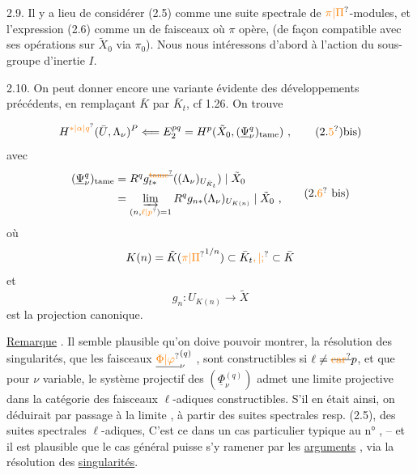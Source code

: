 2.9. Il y a lieu de considérer (2.5) comme une suite spectrale de $\unsure{\pi|\Pi}$-modules, et l'expression (2.6) comme un  de faisceaux  où $\pi$ opère, (de façon compatible avec ses opérations sur $\tilde X_0$ via $\pi_0$). Nous nous intéressons d'abord à l'action du sous-groupe  d'inertie $I$.

2.10. On peut donner encore une variante évidente des développements précédents, en remplaçant $\bar K$ par $\bar K_t$, cf 1.26. On trouve

\[
H^{\unsure{*|\alpha|q}}(\bar U,\Lambda_\nu)^P\Longleftarrow E_2^{pq}=H^p(\tilde X_0,(\underline\Psi_\nu^q)_{\mathrm{tame}})\ ,
\tag*{(2.\unsure{5})bis)}
\]
avec
\[
\begin{aligned}
(\underline\Psi_\nu^q)_{\mathrm{tame}}&=R^qg_{t*}^{\deleted{\unsure{\mathrm{tame}}}}((\Lambda_\nu)_{U_{\bar K_t}})\mid\tilde X_0\\
&=\varinjlim_{(n,\unsure{\ell|p})=1}R^qg_{n*}(\Lambda_\nu)_{U_{K(n)}}\mid\tilde X_0\ ,
\end{aligned}
\tag*{(2.\unsure{6} bis)}
\]
où
\[
K(n)=\tilde K({\unsure{\pi|\Pi}}^{1/n})\subset\bar K_t\unsure{,|;}\subset\bar K
\]
et
\[
g_n:U_{K(n)}\longrightarrow\tilde X
\]
est la projection canonique.

\uline{Remarque} . Il semble plausible qu'on doive pouvoir montrer,   la résolution des singularités, que les faisceaux $\underline{\unsure{\Phi|\varphi}}_\nu^{(q)}$ ,  sont constructibles si $\ell\ne\deleted{\unsure{\mathrm{car}}}p$, et que pour $\nu$ variable, le système projectif des $(\underline\Phi_\nu^{(q)})$   admet une limite projective dans la catégorie des faisceaux $\ell$-adiques constructibles. S'il en était ainsi, on déduirait par passage à la limite , à partir des suites spectrales   resp.  (2.5), des suites spectrales   $\ell$-adiques, \unsure{\S} C'est ce   dans un cas particulier typique au n° , -- et il est plausible que le cas général puisse s'y ramener par les \uline{arguments} , via la résolution des \uline{singularités}.

